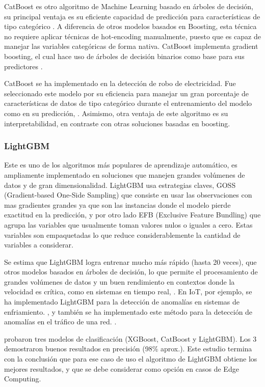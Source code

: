 \documentclass[11pt,a4paper,spanish]{book}
\numberwithin{equation}{chapter}
\numberwithin{figure}{chapter}
\begin{document}
CatBoost es otro algoritmo de Machine Learning basado en árboles de decisión, su 
principal ventaja es su eficiente capacidad de predicción para características de tipo 
categórico  \cite{ibrahim2020catboost}. A diferencia de otros modelos basados en 
Boosting, esta técnica no requiere aplicar técnicas de hot-encoding manualmente, 
puesto que es capaz de manejar las variables categóricas de forma nativa. CatBoost 
implementa gradient boosting, el cual hace uso de árboles de decisión binarios como 
base para sus predictores \cite{prokhorenkova2018catboost}.


CatBoost se ha implementado en la detección de robo de electricidad. Fue seleccionado 
este modelo por su eficiencia para manejar un gran porcentaje de características de 
datos de tipo categórico durante el entrenamiento del modelo como en su predicción, 
\cite{hussain2021catboost}. Asimismo, otra ventaja de este algoritmo es su 
interpretabilidad, en contraste con otras soluciones basadas en boosting. 


\subsubsection{LightGBM}


Este es uno de los algoritmos más populares de aprendizaje automático, es ampliamente 
implementado en soluciones que manejen grandes volúmenes de datos y de gran 
dimensionalidad. LightGBM usa estrategias claves, GOSS 
(Gradient-based One-Side Sampling) que consiste en usar las observaciones con mas 
gradientes grandes ya que son las instancias donde el modelo pierde exactitud en la 
predicción, y por otro lado EFB (Exclusive Feature Bundling) que agrupa las variables 
que usualmente toman valores nulos o iguales a cero. Estas variables son empaquetadas 
lo que reduce considerablemente la cantidad de variables a considerar.


Se estima que LightGBM logra entrenar mucho más rápido (hasta 20 veces), que otros 
modelos basados en árboles de decisión, lo que permite el procesamiento de grandes 
volúmenes de datos y un buen rendimiento en contextos donde la velocidad es crítica, 
como en sistemas en tiempo real, \cite{ke2017lightgbm}. En IoT, por ejemplo, se ha 
implementado LightGBM para la detección de anomalías en sistemas de enfriamiento. 
\cite{yanabe2020lightgbm}, y también se ha implementado este método para la detección 
de anomalías en el tráfico de una red. \cite{islam2020lightgbm}. 


\cite{delasmorenas2025bearing} probaron tres modelos de clasificación 
(XGBoost, CatBoost y LightGBM). Los 3 demostraron buenos resultados en 
precisión (98\% aprox.). Este estudio termina con la conclusión que para ese caso de 
uso el algoritmo de LightGBM obtiene los mejores resultados, y que se debe considerar 
como opción en casos de Edge Computing.
\end{document}
